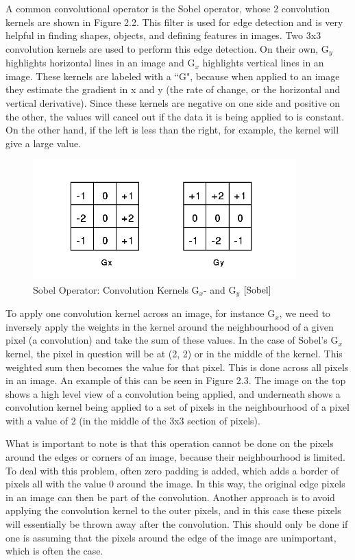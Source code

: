 \documentclass[12pt]{report} %
\begin{document}
	A common convolutional operator is the Sobel operator, whose 2 convolution kernels are shown in Figure 2.2. This filter is used for edge detection and is very helpful in finding shapes, objects, and defining features in images. Two 3x3 convolution kernels are used to perform this edge detection\cite{Sobel}. On their own, G$_{y}$ highlights horizontal lines in an image and G$_{x}$ highlights vertical lines in an image. These kernels are labeled with a ``G", because when applied to an image they estimate the gradient in x and y (the rate of change, or the horizontal and vertical derivative). Since these kernels are negative on one side and positive on the other, the values will cancel out if the data it is being applied to is constant. On the other hand, if the left is less than the right, for example, the kernel will give a large value.
\begin{figure}
\centering
\includegraphics[width=4in]{sobel_operator} 
\caption{Sobel Operator: Convolution Kernels G$_{x}$- and G$_{y}$ $\cite{Sobel}$}
\end{figure}	
	 To apply one convolution kernel across an image, for instance G$_{x}$, we need to inversely apply the weights in the kernel around the neighbourhood of a given pixel (a convolution) and take the sum of these values. In the case of Sobel's G$_{x}$ kernel, the pixel in question will be at (2, 2) or in the middle of the kernel. This weighted sum then becomes the value for that pixel. This is done across all pixels in an image\cite{RiverTrail}. 
	 An example of this can be seen in Figure 2.3. The image on the top shows a high level view of a convolution being applied, and underneath shows a convolution kernel being applied to a set of pixels in the neighbourhood of a pixel with a value of 2 (in the middle of the 3x3 section of pixels).	 
	 
	 What is important to note is that this operation cannot be done on the pixels around the edges or corners of an image, because their neighbourhood is limited. To deal with this problem, often zero padding is added, which adds a border of pixels all with the value 0 around the image. In this way, the original edge pixels in an image can then be part of the convolution\cite{Sobel}. Another approach is to avoid applying the convolution kernel to the outer pixels, and in this case these pixels will essentially be thrown away after the convolution. This should only be done if one is assuming that the pixels around the edge of the image are unimportant, which is often the case.
	 
\end{document}
